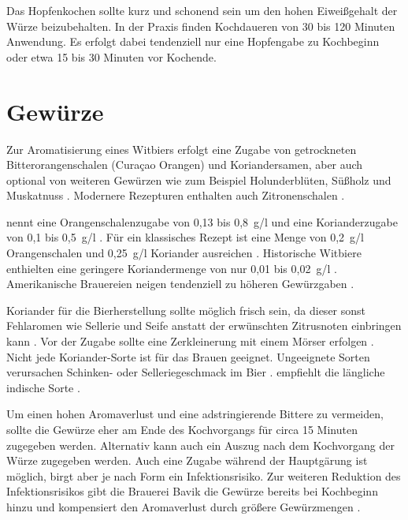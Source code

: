 \documentclass[a4paper,parskip=half]{scrartcl}
\begin{document}
Das Hopfenkochen sollte kurz und schonend sein um den hohen Eiweißgehalt der
Würze beizubehalten. In der Praxis finden Kochdaueren von 30 bis 120
Minuten Anwendung. Es erfolgt dabei tendenziell nur eine Hopfengabe zu
Kochbeginn oder etwa 15 bis 30 Minuten vor Kochende. \parencite[13,17,23-113]{Strottner1999}

\section*{Gewürze}

Zur Aromatisierung eines Witbiers erfolgt eine Zugabe von getrockneten
Bitterorangenschalen (Curaçao Orangen) und Koriandersamen, aber auch
optional von weiteren Gewürzen wie zum Beispiel Holunderblüten,
Süßholz und Muskatnuss \parencite[1]{Strottner1999}. Modernere
Rezepturen enthalten auch Zitronenschalen \parencites[24]{BA2021}.

\citeauthor{Strottner1999} nennt eine Orangenschalenzugabe von
0,13 bis 0,8~g/l und eine Korianderzugabe
von 0,1 bis 0,5~g/l \parencite[13]{Strottner1999}.
Für ein klassisches Rezept ist eine Menge von 0,2~g/l Orangenschalen
und 0,25~g/l Koriander ausreichen \parencite[29]{Sparrow2002}.
Historische Witbiere enthielten eine geringere Koriandermenge
von nur 0,01 bis 0,02~g/l \parencite[40]{Hieronymus2010}.
Amerikanische Brauereien neigen tendenziell zu höheren
Gewürzgaben \parencite[26]{Strong2021}.

Koriander für die Bierherstellung sollte möglich frisch sein, da
dieser sonst Fehlaromen wie Sellerie und Seife anstatt der erwünschten
Zitrusnoten einbringen kann \parencite[26]{Strong2021}. Vor der Zugabe
sollte eine Zerkleinerung mit einem Mörser erfolgen \parencite[29]{Sparrow2002}. Nicht jede Koriander-Sorte ist für das Brauen geeignet. Ungeeignete
Sorten verursachen Schinken- oder Selleriegeschmack im Bier
\parencites[48]{BJCP2015}. \citeauthor{Mosher2015} empfiehlt die längliche
indische Sorte \parencite[338\psq]{Mosher2015}.

Um einen hohen Aromaverlust und eine adstringierende Bittere zu vermeiden,
sollte die Gewürze eher am Ende des Kochvorgangs für circa 15 Minuten
zugegeben werden. Alternativ kann auch ein Auszug nach dem Kochvorgang der
Würze zugegeben werden. Auch eine Zugabe während der Hauptgärung ist möglich,
birgt aber je nach Form ein Infektionsrisiko. \parencite[17\psq]{Strottner1999} 
Zur weiteren Reduktion des Infektionsrisikos gibt die Brauerei
Bavik die Gewürze bereits bei Kochbeginn hinzu und kompensiert den
Aromaverlust durch größere Gewürzmengen \parencite[62]{Hieronymus2010}.
\end{document}
